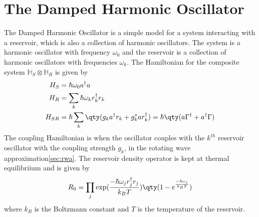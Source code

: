 \documentclass{scrartcl}
\newcommand{\1}{\mathbbm{1}}
\newcommand{\G}{\Gamma}
\newcommand{\h}{\mathbb{H}}
\begin{document}
\section{The Damped Harmonic Oscillator}
The Damped Harmonic Oscillator is a simple model for a system interacting with a reservoir, which is also a collection of
harmonic oscillators. The system is a harmonic oscillator with frequency $\omega_0$ and the reservoir is a collection of harmonic oscillators with frequencies $\omega_k$.
The Hamiltonian for the composite system $\h_S \otimes \h_R$ is given by
\begin{align}
	H_S    & = \hbar \omega_0 a^\dagger a                                                                           \\
	H_R    & = \sum_k \hbar \omega_k r_k^\dagger r_k                                                                \\
	H_{SR} & = \hbar \sum_k \qty(g_k a^\dagger r_k + g_k^* a r_k^\dagger) = \hbar \qty(a \G^\dagger + a^\dagger \G)
\end{align}
The coupling Hamiltonian is when the oscillator couples with the $k^{th}$ reservoir oscillator with the
coupling strength $g_k$, in the rotating wave approximation\cref{sec:rwa}. The reservoir density operator
is kept at thermal equilibriium and is given by
\begin{align}
	R_0  = \prod_j \exp(\frac{- \hbar \omega_j r_j^\dagger r_j}{k_B T}) \qty(1 - e^{\frac{- \hbar \omega_j}{k_B T}})
\end{align}
where $k_B$ is the Boltzmann constant and $T$ is the temperature of the reservoir.
\end{document}
